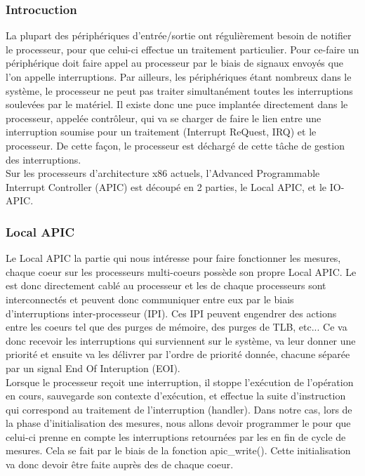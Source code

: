 					\subsubsection{Introcuction}
						La plupart des périphériques d'entrée/sortie ont régulièrement besoin de notifier le processeur, pour que celui-ci effectue un traitement particulier. Pour ce-faire un périphérique doit faire appel au processeur par le biais de signaux envoyés que l'on appelle interruptions. Par ailleurs, les périphériques étant nombreux dans le système, le processeur ne peut pas traiter simultanément toutes les interruptions soulevées par le matériel. Il existe donc une puce implantée directement dans le processeur, appelée contrôleur, qui va se charger de faire le lien entre une interruption soumise pour un traitement (Interrupt ReQuest, IRQ) et le processeur. De cette façon, le processeur est déchargé de cette tâche de gestion des interruptions.\\ 
					Sur les processeurs d'architecture x86 actuels, l'Advanced Programmable Interrupt Controller (APIC) est découpé en 2 parties, le Local APIC, et le IO-APIC. 
					\subsubsection{Local APIC}
						Le Local APIC la partie qui nous intéresse pour faire fonctionner les mesures, chaque coeur sur les processeurs multi-coeurs possède son propre Local APIC. Le \lap est donc directement cablé au processeur et les \lap de chaque processeurs sont interconnectés et peuvent donc communiquer entre eux par le biais d'interruptions inter-processeur (IPI). Ces IPI peuvent engendrer des actions entre les coeurs tel que des purges de mémoire, des purges de TLB, etc... Ce \lap va donc recevoir les interruptions qui surviennent sur le système, va leur donner une priorité et ensuite va les délivrer par l'ordre de priorité donnée, chacune séparée par un signal End Of Interuption (EOI). \\
					Lorsque le processeur reçoit une interruption, il stoppe l'exécution de l'opération en cours, sauvegarde son contexte d'exécution, et effectue la suite d'instruction qui correspond au traitement de l'interruption (handler). Dans notre cas, lors de la phase d'initialisation des mesures, nous allons devoir programmer le \lap pour que celui-ci prenne en compte les interruptions retournées par les \IBS en fin de cycle de mesures. Cela se fait par le biais de la fonction apic\_write(). Cette initialisation va donc devoir être faite auprès des \lap de chaque coeur.\\

